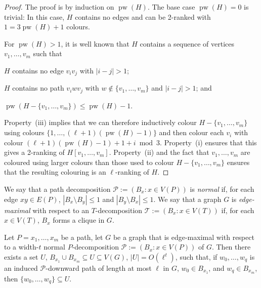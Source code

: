 \documentclass[kpfonts]{patmorin}
\DeclareMathOperator{\pw}{pw}
\theoremstyle{named}
\begin{document}
\begin{proof}
    The proof is by induction on $\pw(H)$.  The base case $\pw(H)=0$ is trivial: In this case, $H$ contains no edges and can be 2-ranked with $1 = 3\pw(H)+1$ colours.

    For $\pw(H)>1$, it is well known that $H$ contains a sequence of vertices $v_1,\ldots,v_m$  such that
    \begin{inparaenum}[(i)]
        \item $H$ contains no edge $v_iv_j$ with $|i-j|>1$;
        \item $H$ contains no path $v_iw v_j$ with $w\not\in\{v_1,\ldots,v_m\}$ and $|i-j|>1$; and
        \item $\pw(H-\{v_1,\ldots,v_m\})\le \pw(H)-1$.
    \end{inparaenum}
    Property~(iii) implies that we can therefore inductively colour $H-\{v_1,\ldots,v_m\}$ using colours $\{1,\ldots,(\ell+1)(\pw(H)-1)\}$ and then colour each $v_i$ with colour $(\ell+1)(\pw(H)-1)+1+i\bmod 3$.  Property~(i) ensures that this gives a 2-ranking of $H[v_1,\ldots,v_m]$.  Property~(ii) and the fact that $v_1,\ldots,v_m$ are coloured using larger colours than those used to colour $H-\{v_1,\ldots,v_m\}$ ensures that the resulting colouring is an $\ell$-ranking of $H$.
\end{proof}

We say that a path decomposition $\mathcal{P}:=(B_x:x\in V(P))$ is \emph{normal} if, for each edge $xy\in E(P)$, $|B_x\setminus B_y|\le 1$ and $|B_y\setminus B_x|\le 1$.  We say that a graph $G$ is \emph{edge-maximal} with respect to an $T$-decomposition $\mathcal{T}:=(B_x:x\in V(T))$ if, for each $x\in V(T)$, $B_x$ forms a clique in $G$.


\begin{lem}
    Let $P=x_1,\ldots,x_m$ be a path, let $G$ be a graph that is edge-maximal with respect to a width-$t$ normal $P$-decomposition $\mathcal{P}:=(B_x:x\in V(P))$ of $G$.  Then there exists a set $U$, $B_{x_1}\cup B_{x_m}\subseteq U \subseteq V(G)$, $|U|=O(\ell^t)$, such that, if $w_0,\ldots,w_q$ is an induced $\mathcal{P}$-downward path of length at most $\ell$ in $G$, $w_0\in B_{x_1}$, and $w_q\in B_{x_m}$, then $\{w_0,\ldots,w_q\}\subseteq U$.
\end{lem}
\end{document}
